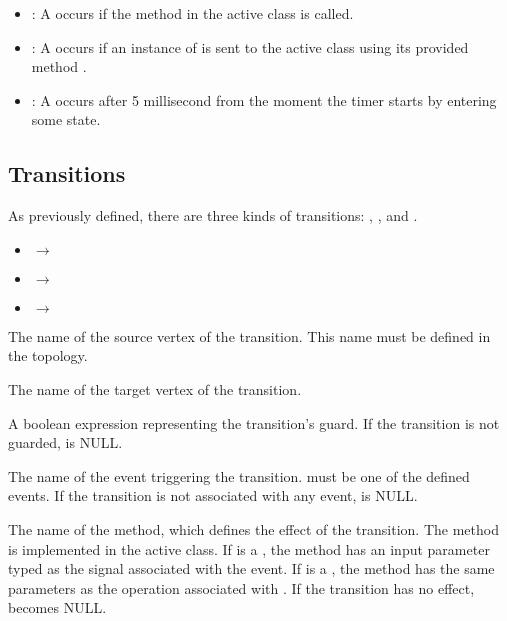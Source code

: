 \begin{itemize}[\footnotesize]
\item {}: A  occurs if the method  in the active class is called.

\item {}: A  occurs if an instance of  is sent to the active class using its provided method .

\item {}: A  occurs after 5 millisecond from the moment the timer starts by entering some state.
\end{itemize}

\subsection{Transitions}
As previously defined, there are three kinds of transitions: , , and .

\noindent
{}
\begin{itemize}[\footnotesize]
\item {} $\rightarrow$  

\item {}$\rightarrow$

\item {} $\rightarrow$ 
\end{itemize}

\noindent
{}
\begin{description}[\footnotesize]
	\item[\ttt{src}] The name of the source vertex of the transition. 
	This name must be defined in the topology.
	
	\item[\ttt{tgt}] The name of the target vertex of the transition. 
	
	\item[\ttt{guard}] A boolean expression representing the transition's guard. If the transition is not guarded,  is NULL.
	
	\item[\ttt{evt}] The name of the event triggering the transition. 
	 must be one of the defined events. 
	If the transition is not associated with any event,  is NULL.
	
	\item[\ttt{eff}] The name of the method, which defines the effect of the transition.
	The method is implemented in the active class.
	If  is a , the method has an input parameter typed as the signal associated with the event.
	If  is a , the method has the same parameters as the operation associated with .
	If the transition has no effect,  becomes NULL.
\end{description}

